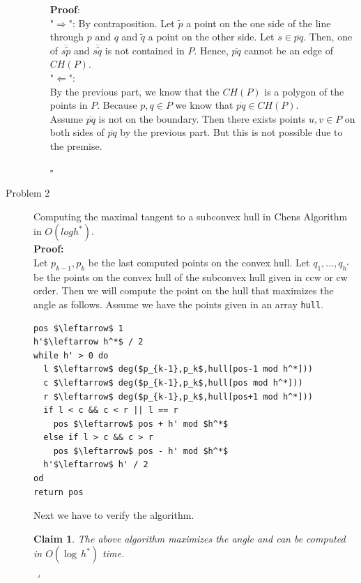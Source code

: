 \documentclass[11pt,a4paper,ngerman]{article}
\newtheorem{lemma}{\bfseries Claim}
\begin{document}
\begin{description}
\begin{enumerate}[a)]
          \textbf{Proof}: \\
          "$\Rightarrow$": By contraposition. Let $\tilde{p}$ a point on the one side of the line
                           through $p$ and $q$ and $\tilde{q}$ a point on the other side.
                           Let $s \in \overline{pq}$. Then, one of $\overline{s\tilde{p}}$ 
                           and $\overline{s\tilde{q}}$ is not contained in $P$. Hence,
                           $\overline{pq}$ cannot be an edge of $CH(P)$. \\
          "$\Leftarrow$": \\
        By the previous part, we know that the $CH(P)$ is a polygon
        of the points in $P$. Because $p,q \in P$ we know that 
        $\overline{pq} \in CH(P)$.\\ 

        Assume $\overline{pq}$ is not
        on the boundary. Then there exists points $u,v \in P$
        on both sides of $\overline{pq}$ by the previous part.
        But this is not possible due to the premise.
                
          \mbox{} \hfill $\square$
  \end{enumerate}

\item[Problem 2] Computing the maximal tangent to a subconvex hull in Chens Algorithm in $O(log h^*)$. \\

\textbf{Proof:}\\

Let $p_{k-1}, p_k$ be the last computed points on the convex hull.
Let $q_1, ..., q_{h^*}$ be the points on the convex hull of the subconvex hull
given in ccw or cw order. Then we will compute the point on the hull that
maximizes the angle as follows. Assume we have the points given in an array
\lstinline|hull|.

\begin{lstlisting}[mathescape=true]
pos $\leftarrow$ 1
h'$\leftarrow h^*$ / 2
while h' > 0 do
  l $\leftarrow$ deg($p_{k-1},p_k$,hull[pos-1 mod h^*]))
  c $\leftarrow$ deg($p_{k-1},p_k$,hull[pos mod h^*]))
  r $\leftarrow$ deg($p_{k-1},p_k$,hull[pos+1 mod h^*]))
  if l < c && c < r || l == r
    pos $\leftarrow$ pos + h' mod $h^*$
  else if l > c && c > r
    pos $\leftarrow$ pos - h' mod $h^*$
  h'$\leftarrow$ h' / 2
od
return pos
\end{lstlisting}

Next we have to verify the algorithm.
\begin{lemma}\label{alge:ueb2:logh}
  The above algorithm maximizes the angle and can be
  computed in $O(\log \, h^*)$ time.\\
\mbox{}\hfill$\lrcorner$
\end{lemma}


\end{description}
\end{document}
